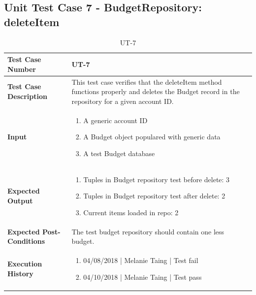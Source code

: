 \documentclass[12pt]{article}
\begin{document}
\subsection{Unit Test Case 7 - BudgetRepository: deleteItem}
\def\arraystretch{1.5}%
\begin{table}[htbp]
\centering
\caption {UT-7}
\label{UT-7}
\begin{tabularx}{\textwidth}{ | l | X |}
\hline
\textbf{Test Case Number}      &  UT-7                         \\ \hline
\textbf{Test Case Description}    &  This test case verifies that the deleteItem method functions properly and deletes the Budget record in the repository for a given account ID.         \\ \hline
\textbf{Input}         & 	\begin{enumerate}
	\item A generic account ID
	\item A Budget object populared with generic data
	\item A test Budget database
\end{enumerate} \\ \hline

\textbf{Expected Output}     & 
	\begin{enumerate}
		\item Tuples in Budget repository test before delete: 3
		\item Tuples in Budget repository test after delete: 2
		\item Current items loaded in repo: 2
	\end{enumerate} \\ \hline
\textbf{Expected Post-Conditions}           & The test budget repository should contain one less budget.            \\ \hline
\textbf{Execution History}   &  \begin{enumerate}
	\item 04/08/2018 | Melanie Taing | Test fail
	\item 04/10/2018 | Melanie Taing | Test pass
\end {enumerate} \\ \hline
\end{tabularx}
\end{table}
\clearpage


\end{document}
